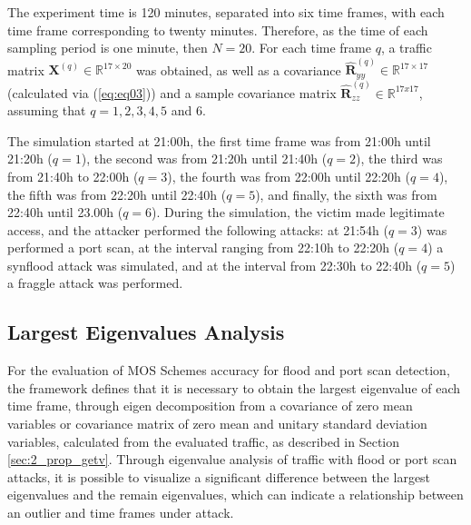 The experiment time is 120 minutes, separated into six time frames, with each time frame corresponding to twenty minutes. Therefore, as the time of each sampling period is one minute, then $N = 20$. For each time frame $q$, a traffic matrix $\boldsymbol{X}^{(q)} \in \mathbb{R}^{17 \times 20}$ was obtained, as well as a covariance $\boldsymbol{\hat{R}}_{yy}^{(q)} \in \mathbb{R}^{17 \times 17}$ (calculated via (\ref{eq:eq03})) and a sample covariance matrix $\boldsymbol{\hat{R}}_{zz}^{(q)} \in \mathbb{R}^{17x17}$, assuming that $q = 1, 2, 3, 4, 5$ and $6$. 

The simulation started at 21:00h, the first time frame was from 21:00h until 21:20h ($q = 1$), the second was from 21:20h until 21:40h ($q = 2$), the third was from 21:40h to 22:00h ($q = 3$), the fourth was from 22:00h until 22:20h ($q = 4$), the fifth was from 22:20h until 22:40h ($q = 5$), and finally, the sixth was from 22:40h until 23.00h ($q = 6$). During the simulation, the victim made legitimate access, and the attacker performed the following attacks: at 21:54h ($q = 3$) was performed a port scan, at the interval ranging from 22:10h to 22:20h ($q = 4$) a synflood attack was simulated, and at the interval from 22:30h to 22:40h ($q = 5$) a fraggle attack was performed.

\subsection{Largest Eigenvalues Analysis}
\label{sec:2_largesteigenvaluesanalysis}

For the evaluation of MOS Schemes accuracy for flood and port scan detection, the framework defines that it is necessary to obtain the largest eigenvalue of each time frame, through eigen decomposition from a covariance of zero mean variables or covariance matrix of zero mean and unitary standard deviation variables, calculated from the evaluated traffic, as described in Section \ref{sec:2_prop_getv}. Through eigenvalue analysis of traffic with flood or port scan attacks, it is possible to visualize a significant difference between the largest eigenvalues and the remain eigenvalues, which can indicate a relationship between an outlier and time frames under attack.

